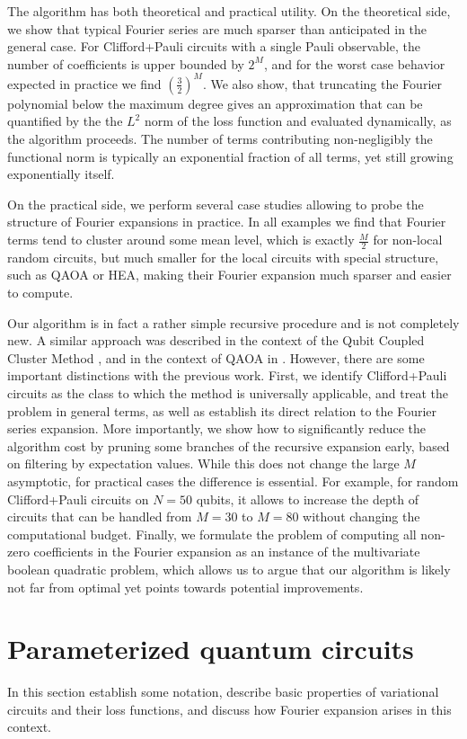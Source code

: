 \documentclass[twocolumn, amsfonts, amssymb, aps, nofootinbib]{revtex4-2}
\newcommand{\CP}{Clifford+Pauli}
\begin{document}
The algorithm has both theoretical and practical utility. On the theoretical side, we show that typical Fourier series are much sparser than anticipated in the general case. For \CP{} circuits with a single Pauli observable, the number of coefficients is upper bounded by $2^M$, and for the worst case behavior expected in practice we find $\left(\frac32\right)^{M}$. We also show, that truncating the Fourier polynomial below the maximum degree gives an approximation that can be quantified by the the $L^2$ norm of the loss function and evaluated dynamically, as the algorithm proceeds. The number of terms contributing non-negligibly the functional norm is typically an exponential fraction of all terms, yet still growing exponentially itself.

On the practical side, we perform several case studies allowing to probe the structure of Fourier expansions in practice. In all examples we find that Fourier terms tend to cluster around some mean level, which is exactly $\frac{M}{2}$ for non-local random circuits, but much smaller for the local circuits with special structure, such as QAOA or HEA, making their Fourier expansion much sparser and easier to compute. 

Our algorithm is in fact a rather simple recursive procedure and is not completely new. A similar approach was described in the context of the Qubit Coupled Cluster Method \cite{Ryabinkin2020}, and in the context of QAOA in \cite{Hadfield2018}. However, there are some important distinctions with the previous work. First, we identify \CP{} circuits as the class to which the method is universally applicable, and treat the problem in general terms, as well as establish its direct relation to the Fourier series expansion. More importantly, we show how to significantly reduce the algorithm cost by pruning some branches of the recursive expansion early, based on filtering by expectation values. While this does not change the large $M$ asymptotic, for practical cases the difference is essential. For example, for random \CP{} circuits on $N=50$ qubits, it allows to increase the depth of circuits that can be handled from $M=30$ to $M=80$ without changing the computational budget. Finally, we formulate the problem of computing all non-zero coefficients in the Fourier expansion as an instance of the multivariate boolean quadratic problem, which allows us to argue that our algorithm is likely not far from optimal yet points towards potential improvements.

\section{Parameterized quantum circuits} \label{sec VQA}
In this section establish some notation, describe basic properties of variational circuits and their loss functions, and discuss how Fourier expansion arises in this context.
\end{document}
